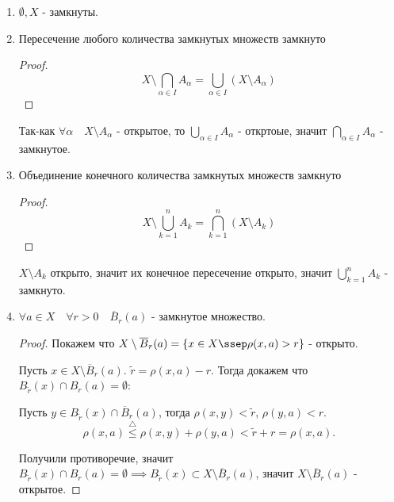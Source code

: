 \begin{properties} \thmslashn

    \begin{enumerate}
        \item $ \emptyset, X$ - замкнуты.
        \item Пересечение любого количества замкнутых множеств замкнуто
            \begin{proof} \thmslashn
            
                \begin{equation*}
                        X \setminus \bigcap_{\alpha\in I} A_{\alpha} = \bigcup_{\alpha\in I} (X \setminus A_{\alpha}) 
                \end{equation*}
            \end{proof}

            Так-как $\forall{\alpha}\quad X \setminus A_{\alpha}$ - открытое, то $\bigcup_{\alpha\in I} A_{\alpha}$ - откртоые, значит $\bigcap_{\alpha\in I} A_{\alpha}$ - замкнутое.

        \item Объединение конечного количества замкнутых множеств замкнуто
            \begin{proof} \thmslashn
            
                \begin{equation*}
                    X \setminus \bigcup_{k = 1}^{n} A_{k} = \bigcap_{k = 1}^{n} (X \setminus A_{k})
                \end{equation*}
            \end{proof}

            $X \setminus A_{k}$ открыто, значит их конечное пересечение открыто, значит $\bigcup_{k=1}^{n} A_{k}$ - замкнуто.
        \item $\forall{a\in X}\quad \forall{r > 0}\quad \overline{B}_{r}(a)$ - замкнутое множество.
            \begin{proof} \thmslashn
            
                Покажем что $X \setminus \overline{B}_{r}(a) = \{x\in X \ssep \rho(x, a) > r\} $ - открыто.

                Пусть $x\in X \setminus \overline{B}_{r}(a)$. $\tilde{r} = \rho(x, a) - r$. Тогда докажем что $B_{\tilde{r}}(x)\cap B_{r}(a) = \emptyset$:

                Пусть $y\in B_{\tilde{r}}(x)\cap \overline{B}_{r}(a)$, тогда $\rho(x, y) < \tilde{r}$, $\rho(y, a) < r$.
                \[ \rho(x, a) \overset{\triangle}{\le} \rho(x, y) + \rho(y, a) < \tilde{r} + r = \rho(x, a)  .\]

                Получили противоречие, значит $B_{\tilde{r}}(x)\cap B_{r}(a) = \emptyset \implies B_{\tilde{r}}(x) \subset X \setminus \overline{B}_{r}(a)$, значит $X \setminus \overline{B}_{r}(a)$ - открытое.
            \end{proof}
    \end{enumerate}
\end{properties}
